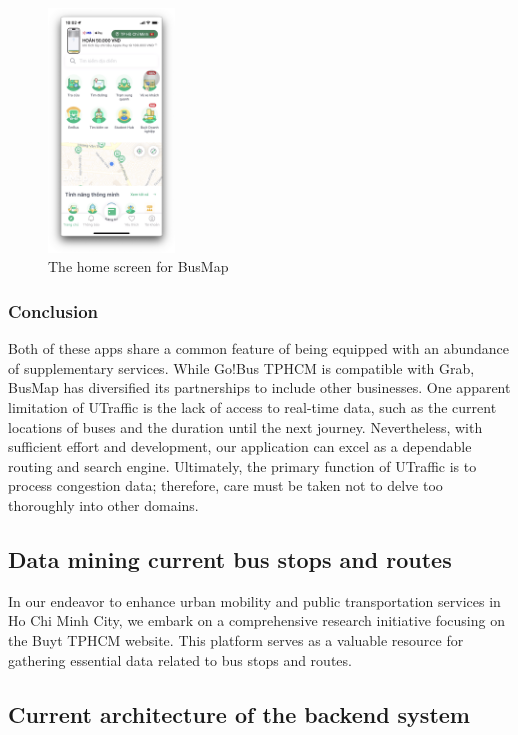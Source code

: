 \begin{figure}[H]
    \centering
    \includegraphics[width=0.3\textwidth]{assets/images/Research/Bus/busmap_home.png}
    \caption{The home screen for BusMap}
    \label{fig:busmap_homescreen}
\end{figure}

\subsubsection{Conclusion}

Both of these apps share a common feature of being equipped with an abundance of supplementary services. While Go!Bus TPHCM is compatible with Grab, BusMap has diversified its partnerships to include other businesses. One apparent limitation of UTraffic is the lack of access to real-time data, such as the current locations of buses and the duration until the next journey. Nevertheless, with sufficient effort and development, our application can excel as a dependable routing and search engine. Ultimately, the primary function of UTraffic is to process congestion data; therefore, care must be taken not to delve too thoroughly into other domains.

\subsection{Data mining current bus stops and routes}

In our endeavor to enhance urban mobility and public transportation services in Ho Chi Minh City, we embark on a comprehensive research initiative focusing on the Buyt TPHCM website. This platform serves as a valuable resource for gathering essential data related to bus stops and routes.


\subsection{Current architecture of the backend system}

